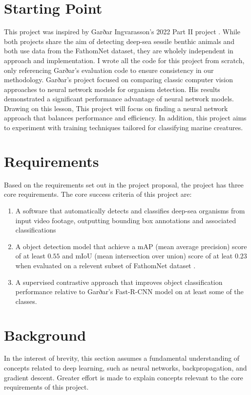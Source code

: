 \documentclass[12pt,a4paper,twoside,openany]{report}
\begin{document}
\section{Starting Point}
This project was inspired by Garðar Ingvarasson's 2022 Part II project \cite{ingvarsson_deep-sea_2022}. While both projects share the aim of detecting deep-sea sessile benthic animals and both use data from the FathomNet \cite{katija_fathomnet_2022} dataset, they are wholely independent in approach and implementation. I wrote all the code for this project from scratch, only referencing Garðar's evaluation code to ensure consistency in our methodology. Garðar's project focused on comparing classic computer vision approaches to neural network models for organism detection. His results demonstrated a significant performance advantage of neural network models. Drawing on this lesson, This project will focus on finding a neural network approach that balances performance and efficiency. In addition, this project aims to experiment with training techniques tailored for classifying marine creatures.

\section{Requirements}
 Based on the requirements set out in the project proposal, the project has three core requirements. The core success criteria of this project are:
\begin{enumerate}
    \item A software that automatically detects and classifies deep-sea organisms from input video footage, outputting bounding box annotations and associated classifications
    \item A object detection model that achieve a mAP (mean average precision) score of at least $0.55$ and mIoU (mean intersection over union) score of at leat $0.23$ when evaluated on a relevent subset of FathomNet dataset \cite{katija_fathomnet_2022}.
    \item A supervised contrastive approach that improves object classification performance relative to Garðar’s Fast-R-CNN model on at least some of the classes.
\end{enumerate}


\section{Background}
In the interest of brevity, this section assumes a fundamental understanding of concepts related to deep learning, such as neural networks, backpropagation, and gradient descent. Greater effort is made to explain concepts relevant to the core requirements of this project.
\end{document}
